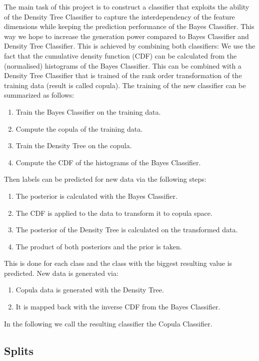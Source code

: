 \documentclass{article}
\begin{document}
The main task of this project is to construct a classifier that exploits the ability of the Density Tree Classifier to capture the 
interdependency of the feature dimensions while keeping the prediction performance of the Bayes Classifier.
This way we hope to increase the generation power compared to Bayes Classifier and Density Tree Classifier.
\newline
This is achieved by combining both classifiers: We use the fact that the cumulative density function (CDF)
can be calculated from the (normalised) histograms of the Bayes Classifier.
This can be combined with a Density Tree Classifier that is trained of the rank order transformation of
the training data (result is called copula).
\newline
The training of the new classifier can be summarized as follows:
\begin{enumerate}
\item Train the Bayes Classifier on the training data.
\item Compute the copula of the training data.
\item Train the Density Tree on the copula.
\item Compute the CDF of the histograms of the Bayes Classifier. 
\end{enumerate}
Then labels can be predicted for new data via the following steps:
\begin{enumerate}
\item The posterior is calculated with the Bayes Classifier. 
\item The CDF is applied to the data to transform it to copula space.
\item The posterior of the Density Tree is calculated on the transformed data.
\item The product of both posteriors and the prior is taken.
\end{enumerate}
This is done for each class and the class with the biggest resulting value is predicted.
\newline
New data is generated via:
\begin{enumerate}
\item Copula data is generated with the Density Tree.
\item It is mapped back with the inverse CDF from the Bayes Classifier.
\end{enumerate}
In the following we call the resulting classifier the Copula Classifier.

\subsection{Splits}
\end{document}
